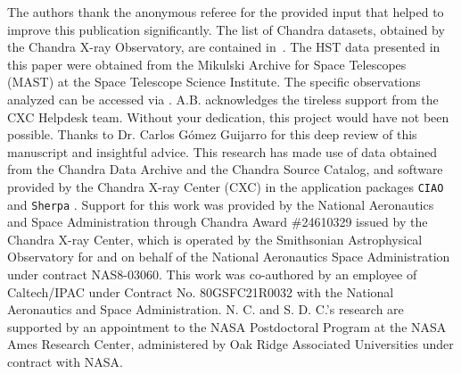 \documentclass[modern]{aastex631}
\begin{document}
\begin{acknowledgments}
The authors thank the anonymous referee for the provided input that helped to improve this publication significantly. The list of Chandra datasets, obtained by the Chandra X-ray Observatory, are contained in~. The HST data presented in this paper were obtained from the Mikulski Archive for Space Telescopes (MAST) at the Space Telescope Science Institute. The specific observations analyzed can be accessed via . A.B. acknowledges the tireless support from 
% 
the CXC Helpdesk team. Without your dedication, this project would have not been possible. Thanks to Dr. Carlos G\'{o}mez Guijarro for this deep review of this manuscript and insightful advice. This research has made use of data obtained from the Chandra Data Archive and the Chandra Source Catalog, and software provided by the Chandra X-ray Center (CXC) in the application packages \texttt{CIAO} \citep{fruscione+2006inproceedings_62701V} and \texttt{Sherpa} \citep{freeman+2001inproceedings_76}. 
Support for this work was provided by the National Aeronautics and Space Administration through Chandra Award \#24610329 issued by the Chandra X-ray Center, which is operated by the Smithsonian Astrophysical Observatory for and on behalf of the National Aeronautics Space Administration under contract NAS8-03060.
This work was co-authored by an employee of Caltech/IPAC under Contract No. 80GSFC21R0032 with the National Aeronautics and Space Administration. N. C. and S. D. C.'s research are supported by an appointment to the NASA Postdoctoral Program at the NASA Ames Research Center, administered by Oak Ridge Associated Universities under contract with NASA. 
\end{acknowledgments}

%
\end{document}
